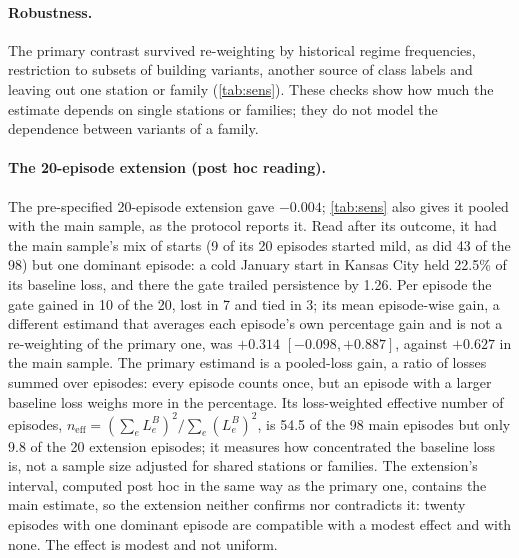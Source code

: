 \paragraph{Robustness.}
The primary contrast survived re-weighting by historical regime frequencies, restriction to subsets of building
variants, another source of class labels and leaving out one station or family (\cref{tab:sens}). These checks show how
much the estimate depends on single stations or families; they do not model the dependence between variants of a family.

\paragraph{The 20-episode extension (post hoc reading).}
The pre-specified 20-episode extension gave $-0.004$\pp; \cref{tab:sens} also gives it pooled with the main sample, as the
protocol reports it. Read after its outcome, it had the main sample's mix of starts (9 of its 20 episodes started mild, as
did 43 of the 98) but one dominant episode: a cold January start in Kansas City held 22.5\% of its baseline loss, and there
the gate trailed persistence by 1.26\pp. Per episode the gate gained in 10 of the 20, lost in 7 and tied in 3; its mean
episode-wise gain, a different estimand that averages each episode's own percentage gain and is not a re-weighting of the
primary one, was $+0.314$\pp{} $[-0.098, +0.887]$, against $+0.627$\pp{} in the main sample. The primary estimand is a
pooled-loss gain, a ratio of losses summed over episodes: every episode counts once, but an episode with a larger baseline
loss weighs more in the percentage. Its loss-weighted effective number of episodes, $n_{\mathrm{eff}} = (\sum_e L^{B}_e)^2/\sum_e
(L^{B}_e)^2$, is 54.5 of the 98 main episodes but only 9.8 of the 20 extension episodes; it measures how concentrated the
baseline loss is, not a sample size adjusted for shared stations or families. The extension's interval, computed
post hoc in the same way as the primary one, contains the main estimate, so the extension neither confirms nor contradicts
it: twenty episodes with one dominant episode are compatible with a modest effect and with none. The effect is modest and
not uniform.

